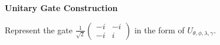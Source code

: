 \documentclass[a4paper, 10pt]{article}
\begin{document}
\subject
{}

\begin{problem}
\textbf{Unitary Gate Construction}
\par Represent the gate \( \frac{1}{\sqrt{2}} \begin{pmatrix} -i & -i \\ -i & i \end{pmatrix} \)
in the form of \( U_{\theta, \phi, \lambda, \gamma} \).
\end{problem}
\end{document}
